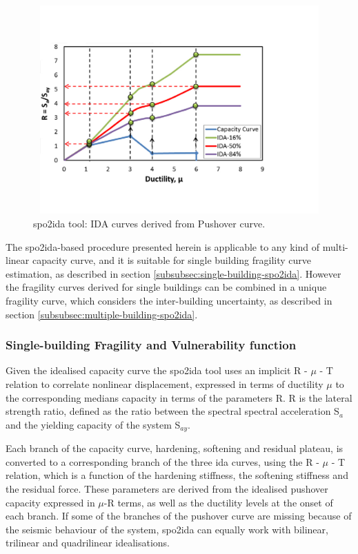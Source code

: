 \begin{figure}[H]
\centering
\includegraphics[width=12cm,height=8cm]{./figures/spo2ida.jpg}
\caption{spo2ida tool: IDA curves derived from Pushover curve.}
\label{fig:spo2ida}
\end{figure}

The spo2ida-based procedure presented herein is applicable to any kind of multi-linear capacity curve, and it is suitable for single building fragility curve estimation, as described in section \ref{subsubsec:single-building-spo2ida}. However the fragility curves derived for single buildings can be combined in a unique fragility curve, which considers the inter-building uncertainty, as described in section \ref{subsubsec:multiple-building-spo2ida}.

\subsubsection{Single-building Fragility and Vulnerability function}
\label{subsub:single-building-spo2ida}
Given the idealised capacity curve the spo2ida tool uses an implicit R - $\mu$ - T relation to correlate nonlinear displacement, expressed in terms of ductility $\mu$ to the corresponding medians capacity in terms of the parameters R. R is the lateral strength ratio, defined as the ratio between the spectral spectral acceleration S$_a$ and the yielding capacity of the system S$_{ay}$. 

Each branch of the capacity curve, hardening, softening and residual plateau, is converted to a corresponding branch of the three ida curves, using the R - $\mu$ - T relation, which is a function of the hardening stiffness, the softening stiffness and the residual force. These parameters are derived from the idealised pushover capacity expressed in $\mu$-R terms, as well as the ductility levels at the onset of each branch. If some of the branches of the pushover curve are missing because of the seismic behaviour of the system, spo2ida can equally work with bilinear, trilinear and quadrilinear idealisations.

